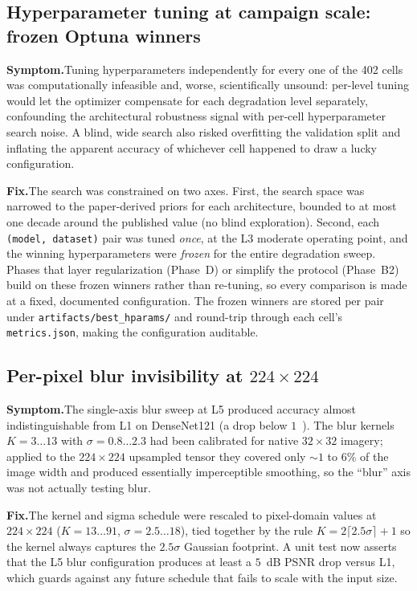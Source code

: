 \subsection{Hyperparameter tuning at campaign scale: frozen Optuna winners}
\textbf{Symptom.}\quad Tuning hyperparameters independently for every one of the
402 cells was computationally infeasible and, worse, scientifically unsound:
per-level tuning would let the optimizer compensate for each degradation level
separately, confounding the architectural robustness signal with per-cell
hyperparameter search noise. A blind, wide search also risked overfitting the
validation split and inflating the apparent accuracy of whichever cell happened
to draw a lucky configuration.

\textbf{Fix.}\quad The search was constrained on two axes. First, the search
space was narrowed to the paper-derived priors for each architecture, bounded to
at most one decade around the published value (no blind exploration). Second,
each \texttt{(model, dataset)} pair was tuned \emph{once}, at the L3 moderate
operating point, and the winning hyperparameters were \emph{frozen} for the
entire degradation sweep. Phases that layer regularization (Phase~D) or simplify
the protocol (Phase~B2) build on these frozen winners rather than re-tuning, so
every comparison is made at a fixed, documented configuration. The frozen
winners are stored per pair under \texttt{artifacts/best\_hparams/} and round-trip
through each cell's \texttt{metrics.json}, making the configuration auditable.

\subsection{Per-pixel blur invisibility at \texorpdfstring{$224 \times 224$}{224x224}}
\textbf{Symptom.}\quad The single-axis blur sweep at L5 produced accuracy almost
indistinguishable from L1 on DenseNet121 (a drop below $1$~\Mpp{}). The blur
kernels $K = 3 \ldots 13$ with $\sigma = 0.8 \ldots 2.3$ had been calibrated for
native $32 \times 32$ imagery; applied to the $224 \times 224$ upsampled tensor
they covered only $\sim 1$ to $6\%$ of the image width and produced essentially
imperceptible smoothing, so the ``blur'' axis was not actually testing blur.

\textbf{Fix.}\quad The kernel and sigma schedule were rescaled to pixel-domain
values at $224 \times 224$ ($K = 13 \ldots 91$, $\sigma = 2.5 \ldots 18$), tied
together by the rule $K = 2\lceil 2.5\sigma \rceil + 1$ so the kernel always
captures the $2.5\sigma$ Gaussian footprint. A unit test now asserts that the L5
blur configuration produces at least a $5$~dB PSNR drop versus L1, which guards
against any future schedule that fails to scale with the input size.

